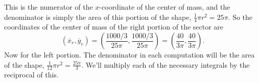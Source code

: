 \documentclass[12pt]{amsart}
\begin{document}
This is the numerator of the $x$-coordinate of the center of mass, and the denominator is simply the area of this portion of the shape, $\frac{1}{4}\pi r^2 = 25\pi$.  So the coordinates of the center of mass of the right portion of the sector are $$\left(\overline{x}_r, \overline{y}_r\right) = \left(\frac{1000/3}{25\pi}, \frac{1000/3}{25\pi}\right) = \left(\frac{40}{3\pi}, \frac{40}{3\pi}\right).$$
Now for the left portion. The denominator in each computation will be the area of the shape, $\frac{1}{12}\pi r^2 = \frac{25\pi}{3}$.  We'll multiply each of the necessary integrals by the reciprocal of this.

\end{document}

